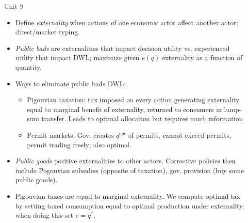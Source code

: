 \documentclass[10pt,twocolumn]{article}
\begin{document}
Unit 9
\begin{itemize}
    \item Define \emph{externality} when actions of one economic actor affect another actor; direct/market typing. 
    \item \emph{Public bads} are externalities that impact decision utility vs. experienced utility that impact DWL; maximize given $e(q)$ externality as a function of quantity.
    \item Ways to eliminate public bads DWL:
        \begin{itemize}
            \item Pigouvian taxation: tax imposed on every action generating externality equal to marginal benefit of externality, returned to consumers in lump-sum transfer. Leads to optimal allocation but requires much information 
            \item Permit markets: Gov. creates $q^{opt}$ of permits, cannot exceed permits, permit trading freely; also optimal.
        \end{itemize}
    \item \emph{Public goods} positive externalities to other actors. Corrective policies then include Pogouvian subsidies (opposite of taxation), gov. provision (buy some public goods). 
    \item Pigouvian taxes are equal to marginal externality. We compute optimal tax by setting taxed consumption equal to optimal production under externality; when doing this set $e = q^*$. 
\end{itemize}
\end{document}

